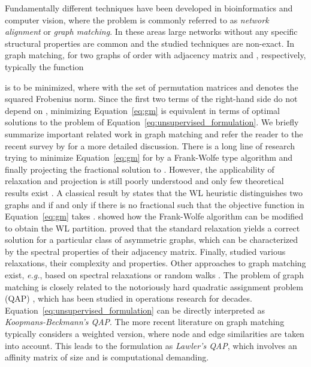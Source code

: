 \documentclass{article}
\def\eg{\emph{e.g.}} \def\Eg{\emph{E.g.}}  \def\ie{\emph{i.e.}} \def\Ie{\emph{I.e.}}  \def\cf{\emph{cf.}}  \def\Cf{\emph{Cf.}}
\begin{document}
Fundamentally different techniques have been developed in bioinformatics and computer vision, where the problem is commonly referred to as \emph{network alignment} or \emph{graph matching}.
In these areas large networks without any specific structural properties are common and the studied techniques are non-exact.
In graph matching, for two graphs of order  with adjacency matrix  and , respectively, typically the function

is to be minimized, where  with  the set of  permutation matrices and  denotes the squared Frobenius norm.
Since the first two terms of the right-hand side do not depend on , minimizing Equation~\eqref{eq:gm} is equivalent in terms of optimal solutions to the problem of Equation~\eqref{eq:unsupervised_formulation}.
We briefly summarize important related work in graph matching and refer the reader to the recent survey by \citet{Yan/etal/2016} for a more detailed discussion.
There is a long line of research trying to minimize Equation~\eqref{eq:gm} for  by a Frank-Wolfe type algorithm \citep{Jaggi/2013} and finally projecting the fractional solution to  \citep{Gold/Rangarajan/1996,Zaslavskiy/etal/2009,Leordeanu/etal/2009,Egozi/etal/2013,Zhou/DeLaTorre/2016}.
However, the applicability of relaxation and projection is still poorly understood and only few theoretical results exist \citep{Aflalo/etal/2015,Lyzinski/etal/2016}.
A classical result by \citet{Tinhofer/1991} states that the WL heuristic distinguishes two graphs  and  if and only if there is no fractional  such that the objective function in Equation~\eqref{eq:gm} takes .
\citet{Kersting/etal/2014} showed how the Frank-Wolfe algorithm can be modified to obtain the WL partition.
\citet{Aflalo/etal/2015} proved that the standard relaxation yields a correct solution for a particular class of asymmetric graphs, which can be characterized by the spectral properties of their adjacency matrix.
Finally, \citet{Bento/Ioannidis/2018} studied various relaxations, their complexity and properties.
Other approaches to graph matching exist, \eg, based on spectral relaxations \citep{Umeyama/1988,Leordeanu/Hebert/2005} or random walks \citep{Gori/etal/2005}.
The problem of graph matching is closely related to the notoriously hard quadratic assignment problem (QAP) \citep{Zhou/DeLaTorre/2016}, which has been studied in operations research for decades.
Equation~\eqref{eq:unsupervised_formulation} can be directly interpreted as \emph{Koopmans-Beckmann's QAP}.
The more recent literature on graph matching typically considers a weighted version, where node and edge similarities are taken into account. This leads to the formulation as \emph{Lawler's QAP}, which involves an affinity matrix of size  and is computational demanding.
\end{document}
